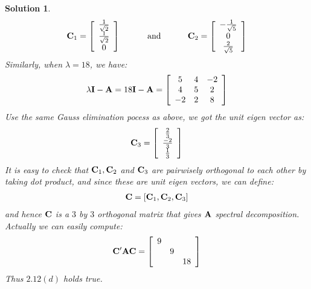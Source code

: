 \documentclass[11pt]{article}\usepackage[]{graphicx}\usepackage[]{color}
\newtheorem{sol}{Solution}
\begin{document}
\begin{sol}
	\begin{align*}
		{\bf C}_1 = \left[\begin{array}{c} \frac{1}{\sqrt{2}}\\ \frac{1}{\sqrt{2}}\\ 0\end{array}\right] \hskip 1cm \text{ and }\hskip 1cm {\bf C}_2= \left[\begin{array}{c} -\frac{1}{\sqrt{5}}\\ 0\\ \frac{2}{\sqrt{5}}\end{array}\right] 
	\end{align*} 
	Similarly, when $\lambda = 18$, we have:
	\begin{align*}
		\lambda {\bf I} - {\bf A} = 18{\bf I} - {\bf A} = \left[\begin{array}{ccc} 5&4& -2\\ 4&5&2 \\-2 &2&8 \end{array}\right]
	\end{align*}
	Use the same Gauss elimination pocess as above, we got the unit eigen vector as:
	\begin{align*}
		{\bf C}_3 = \left[\begin{array}{c} \frac{2}{3}\\ \frac{-2}{3}\\ \frac{1}{3}\end{array}\right]
	\end{align*}
	It is easy to check that ${\bf C}_1, {\bf C}_2$ and ${\bf C}_3$ are pairwisely orthogonal to each other by taking dot product, and since these are unit eigen vectors, we can define:
	\begin{align*}
		{\bf C} = [{\bf C}_1, {\bf C}_2, {\bf C}_3]
	\end{align*}
	and hence ${\bf C}$ is a $3$ by $3$ orthogonal matrix that gives ${\bf A}$ spectral decomposition. Actually we can easily compute:
	\begin{align*}
		{\bf C}'{\bf A}{\bf C} = \left[\begin{array}{ccc}9&&\\ &9&\\ &&18\end{array}\right]
	\end{align*}
	Thus $2.12(d)$ holds true.
\end{sol}
\end{document}
